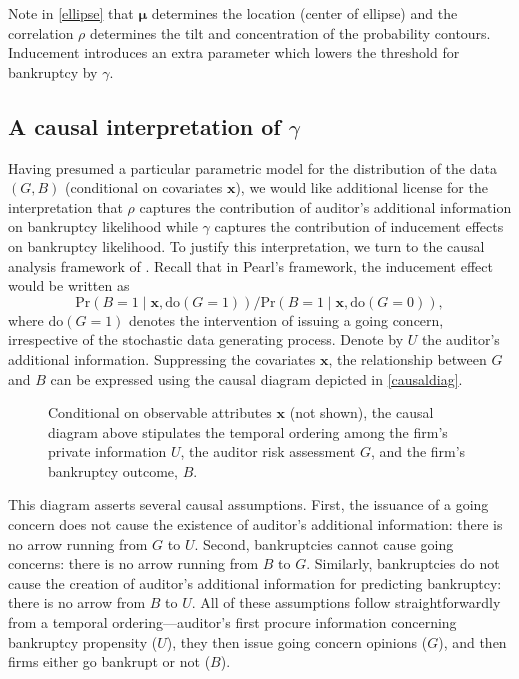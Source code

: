 \documentclass[aoas,preprint, 11pt, dvipsnames, table, x11name]{imsart}
\renewcommand{\bm}[1]{\mathbf{#1}}
\theoremstyle{remark}
\begin{document}
	Note in \autoref{ellipse} that $\bm{\mu}$ determines the location (center of ellipse) and the correlation $\rho$ determines the tilt and concentration of the probability contours. Inducement introduces an extra parameter which lowers the threshold for bankruptcy by $\gamma$.  
	
	\subsection{A causal interpretation of $\gamma$}
	
	Having presumed a particular parametric model for the distribution of the data $(G,B)$ (conditional on covariates $\mathbf{x}$), we would like additional license for the interpretation that $\rho$ captures the contribution of auditor's additional information on bankruptcy likelihood while $\gamma$ captures the contribution of inducement effects on bankruptcy likelihood. To justify this interpretation, we turn to the causal analysis framework of \cite{pearl-2000}. Recall that in Pearl's framework, the inducement effect would be written as 
	\begin{equation}\label{docalc}
		\mbox{Pr}(B = 1 \mid \mathbf{x}, \text{do}(G = 1)) / \mbox{Pr}(B = 1 \mid \mathbf{x}, \text{do}(G = 0)),
	\end{equation}
	where $\text{do}(G=1)$ denotes the intervention of issuing a going concern, irrespective of the stochastic data generating process. Denote by $U$ the auditor's additional information.  Suppressing the covariates $\mathbf{x}$, the relationship between $G$ and $B$ can be expressed using the causal diagram depicted in \autoref{causaldiag}.
	
	\begin{figure}[h!]
		\caption{Conditional on observable attributes $\mathbf{x}$ (not shown), the causal diagram above stipulates the temporal ordering among the firm's private information $U$, the auditor risk assessment $G$, and the firm's bankruptcy outcome, $B$.}\label{causaldiag} 
	\end{figure}
	
	This diagram asserts several causal assumptions.  First, the issuance of a going concern does not cause the existence of auditor's additional information:  there is no arrow running from $G$ to $U$.  Second, bankruptcies cannot cause going concerns:  there is no arrow running from $B$ to $G$.  Similarly, bankruptcies do not cause the creation of auditor's additional information for predicting bankruptcy:  there is no arrow from $B$ to $U$.  All of these assumptions follow straightforwardly from a temporal ordering---auditor's first procure information concerning bankruptcy propensity ($U$), they then issue going concern opinions ($G$), and then firms either go bankrupt or not ($B$).  
	
\end{document}

